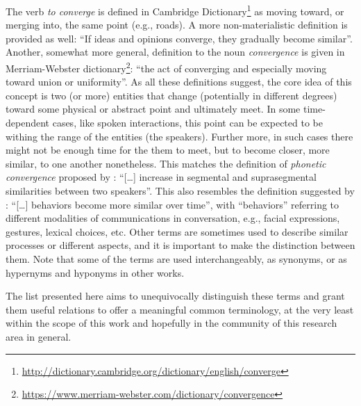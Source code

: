 The verb \textit{to converge} is defined in Cambridge Dictionary\footnote{\url{http://dictionary.cambridge.org/dictionary/english/converge}} as moving toward, or merging into, the same point (e.g., roads).
A more non-materialistic definition is provided as well: \enquote{If ideas and opinions converge, they gradually become similar}.
Another, somewhat more general, definition to the noun \textit{convergence} is given in Merriam-Webster dictionary\footnote{\url{https://www.merriam-webster.com/dictionary/convergence}}: \enquote{the act of converging and especially moving toward union or uniformity}.
As all these definitions suggest, the core idea of this concept is two (or more) entities that change (potentially in different degrees) toward some physical or abstract point and ultimately meet.
In some time-dependent cases, like spoken interactions, this point can be expected to be withing the range of the entities (the speakers).
Further more, in such cases there might not be enough time for the them to meet, but to become closer, more similar, to one another nonetheless.
This matches the definition of \emph{phonetic convergence} proposed by \citet{Pardo2006phonetic}: \enquote{[\ldots] increase in segmental and suprasegmental similarities between two speakers}.
This also resembles the definition suggested by \citet{Xia2014prosodic}: \enquote{[\ldots] behaviors become more similar over time}, with \enquote{behaviors} referring to different modalities of communications in conversation, e.g., facial expressions, gestures, lexical choices, etc.
Other terms are sometimes used to describe similar processes or different aspects, and it is important to make the distinction between them.
Note that some of the terms are used interchangeably, as synonyms, or as hypernyms and hyponyms in other works.

The list presented here aims to unequivocally distinguish these terms and grant them useful relations to offer a meaningful common terminology, at the very least within the scope of this work and hopefully in the community of this research area in general.

